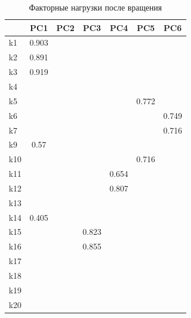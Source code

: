 \documentclass[14pt,a4paper]{extarticle}
\begin{document}
\begin{table}[H]
    \centering
    \caption{Факторные нагрузки после вращения}
    \label{tab:pc_after}
    \small
    \begin{tabular}{l|c|c|c|c|c|c}
        \toprule
        & PC1 & PC2 & PC3 & PC4 & PC5 & PC6 \\
        \midrule
        k1 & 0.903 &       &       &       &       &       \\ 
        \hline
        k2 & 0.891 &       &       &       &       &       \\ 
        \hline
        k3 & 0.919 &       &       &       &       &       \\ 
        \hline
        k4 &       &       &       &       &       &       \\ 
        \hline
        k5 &       &       &       &       & 0.772 &       \\ 
        \hline
        k6 &       &       &       &       &       & 0.749 \\ 
        \hline
        k7 &       &       &       &       &       & 0.716 \\ 
        \hline
        k9 & 0.57 &       &       &       &       &       \\ 
        \hline
        k10 &       &       &       &       & 0.716 &       \\ 
        \hline
        k11 &       &       &       & 0.654 &       &       \\ 
        \hline
        k12 &       &       &       & 0.807 &       &       \\ 
        \hline
        k13 &       &       &       &       &       &       \\ 
        \hline
        k14 & 0.405 &       &       &       &       &       \\ 
        \hline
        k15 &       &       & 0.823 &       &       &       \\ 
        \hline
        k16 &       &       & 0.855 &       &       &       \\ 
        \hline
        k17 &       &       &       &       &       &       \\ 
        \hline
        k18 &       &       &       &       &       &       \\ 
        \hline
        k19 &       &       &       &       &       &       \\ 
        \hline
        k20 &       &       &       &       &       &       \\ 
        \bottomrule
    \end{tabular}
\end{table}
\end{document}
